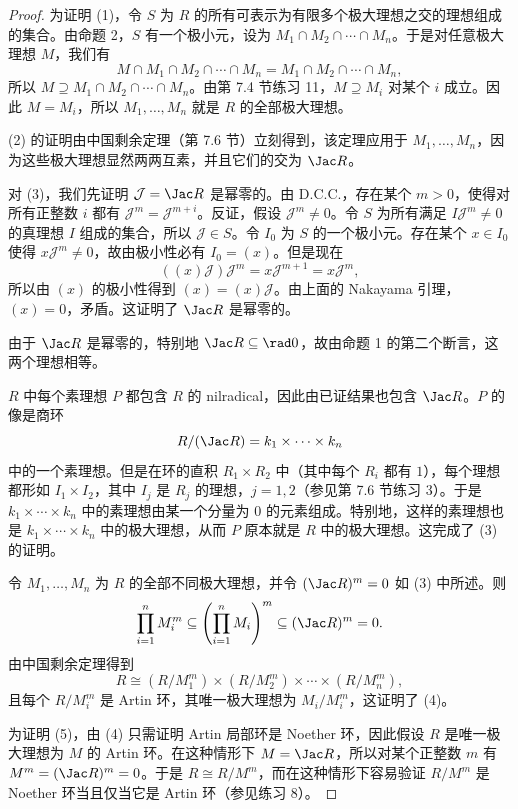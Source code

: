 \begin{proof}
为证明 (1)，令 $S$ 为 $R$ 的所有可表示为有限多个极大理想之交的理想组成的集合。由命题 2，$S$ 有一个极小元，设为 $M_1\cap M_2\cap\cdots\cap M_n$。于是对任意极大理想 $M$，我们有
\[
  M\cap M_1\cap M_2\cap\cdots\cap M_n=M_1\cap M_2\cap\cdots\cap M_n,
\]
所以 $M\supseteq M_1\cap M_2\cap\cdots\cap M_n$。由第 7.4 节练习 11，$M\supseteq M_i$ 对某个 $i$ 成立。因此 $M=M_i$，所以 $M_1,\ldots,M_n$ 就是 $R$ 的全部极大理想。

(2) 的证明由中国剩余定理（第 7.6 节）立刻得到，该定理应用于 $M_1,\ldots,M_n$，因为这些极大理想显然两两互素，并且它们的交为 $\Jac R$。

对 (3)，我们先证明 $\mathcal J=\Jac R$ 是幂零的。由 D.C.C.，存在某个 $m>0$，使得对所有正整数 $i$ 都有 $\mathcal J^m=\mathcal J^{m+i}$。反证，假设 $\mathcal J^m\neq0$。令 $S$ 为所有满足 $I\mathcal J^m\neq0$ 的真理想 $I$ 组成的集合，所以 $\mathcal J\in S$。令 $I_0$ 为 $S$ 的一个极小元。存在某个 $x\in I_0$ 使得 $x\mathcal J^m\neq0$，故由极小性必有 $I_0=(x)$。但是现在
\[
  ((x)\mathcal J)\mathcal J^m=x\mathcal J^{m+1}=x\mathcal J^m,
\]
所以由 $(x)$ 的极小性得到 $(x)=(x)\mathcal J$。由上面的 Nakayama 引理，$(x)=0$，矛盾。这证明了 $\Jac R$ 是幂零的。

由于 $\Jac R$ 是幂零的，特别地 $\Jac R\subseteq\rad0$，故由命题 1 的第二个断言，这两个理想相等。

$R$ 中每个素理想 $P$ 都包含 $R$ 的 nilradical，因此由已证结果也包含 $\Jac R$。$P$ 的像是商环
\[
  R/(\Jac R)=k_1\times\cdots\times k_n
\]
中的一个素理想。但是在环的直积 $R_1\times R_2$ 中（其中每个 $R_i$ 都有 $1$），每个理想都形如 $I_1\times I_2$，其中 $I_j$ 是 $R_j$ 的理想，$j=1,2$（参见第 7.6 节练习 3）。于是 $k_1\times\cdots\times k_n$ 中的素理想由某一个分量为 $0$ 的元素组成。特别地，这样的素理想也是 $k_1\times\cdots\times k_n$ 中的极大理想，从而 $P$ 原本就是 $R$ 中的极大理想。这完成了 (3) 的证明。

令 $M_1,\ldots,M_n$ 为 $R$ 的全部不同极大理想，并令 $(\Jac R)^m=0$ 如 (3) 中所述。则
\[
  \prod_{i=1}^n M_i^m\subseteq\left(\prod_{i=1}^n M_i\right)^m\subseteq (\Jac R)^m=0.
\]
由中国剩余定理得到
\[
  R\cong (R/M_1^m)\times (R/M_2^m)\times\cdots\times (R/M_n^m),
\]
且每个 $R/M_i^m$ 是 Artin 环，其唯一极大理想为 $M_i/M_i^m$，这证明了 (4)。

为证明 (5)，由 (4) 只需证明 Artin 局部环是 Noether 环，因此假设 $R$ 是唯一极大理想为 $M$ 的 Artin 环。在这种情形下 $M=\Jac R$，所以对某个正整数 $m$ 有 $M^m=(\Jac R)^m=0$。于是 $R\cong R/M^m$，而在这种情形下容易验证 $R/M^m$ 是 Noether 环当且仅当它是 Artin 环（参见练习 8）。
\end{proof}

